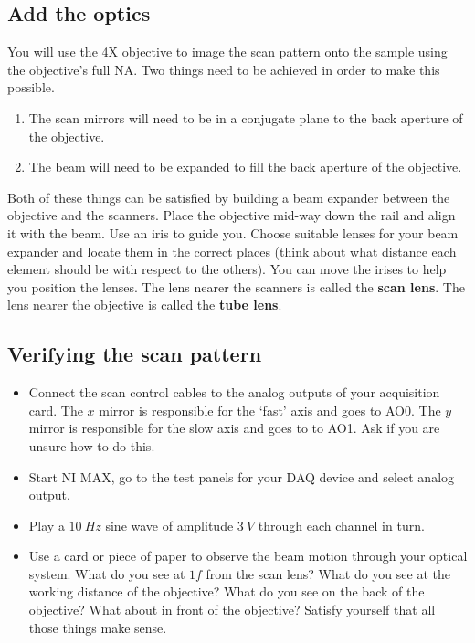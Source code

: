\documentclass[a4paper]{report}
\begin{document}
\subsection{Add the optics}
You will use the 4X objective to image the scan pattern onto the sample using the objective's full NA. 
Two things need to be achieved in order to make this possible. 
\begin{enumerate}
\setlength\itemsep{0.1em}
\item The scan mirrors will need to be in a conjugate plane to the back aperture of the objective. 
\item The beam will need to be expanded to fill the back aperture of the objective. 
\end{enumerate}

Both of these things can be satisfied by building a beam expander between the objective and the scanners. 
Place the objective mid-way down the rail and align it with the beam. Use an iris to guide you.
Choose suitable lenses for your beam expander and locate them in the correct places 
(think about what distance each element should be with respect to the others). 
You can move the irises to help you position the lenses. 
The lens nearer the scanners is called the \textbf{scan lens}.
The lens nearer the objective is called the \textbf{tube lens}.

\subsection{Verifying the scan pattern}
\begin{itemize}
\item Connect the scan control cables to the analog outputs of your acquisition card. 
The $x$ mirror is responsible for the `fast' axis and goes to AO0. The $y$ mirror is responsible for the slow axis and goes to to AO1. 
Ask if you are unsure how to do this. 
\item Start NI MAX, go to the test panels for your DAQ device and select analog output. 
\item Play a $10~Hz$ sine wave of amplitude $3~V$ through each channel in turn. 
\item Use a card or piece of paper to observe the beam motion through your optical system. 
What do you see at $1f$ from the scan lens?
What do you see at the working distance of the objective?
What do you see on the back of the objective?
What about in front of the objective?
Satisfy yourself that all those things make sense.
\end{itemize}
\end{document}
